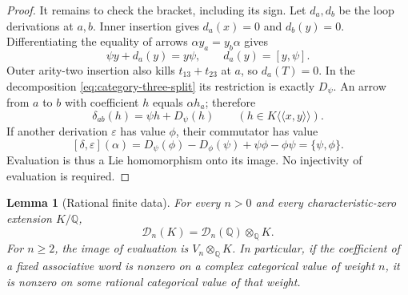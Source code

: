 \documentclass[11pt]{article}
\newtheorem{lemma}[theorem]{Lemma}
\theoremstyle{definition}
\theoremstyle{remark}
\numberwithin{equation}{section}
\begin{document}
\begin{proof}
It remains to check the bracket, including its sign.  Let $d_a,d_b$
be the loop derivations at $a,b$.  Inner insertion gives $d_a(x)=0$
and $d_b(y)=0$.  Differentiating the equality of arrows
$\alpha y_a=y_b\alpha$ gives
\[
 \psi y+d_a(y)=y\psi,
 \qquad d_a(y)=[y,\psi].
\]
Outer arity-two insertion also kills $t_{13}+t_{23}$ at $a$, so
$d_a(T)=0$.  In the decomposition
\eqref{eq:category-three-split} its restriction is exactly $D_\psi$.
An arrow from $a$ to $b$ with coefficient $h$ equals $\alpha h_a$;
therefore
\begin{equation}\label{eq:category-arrow-derivative}
 \delta_{ab}(h)=\psi h+D_\psi(h)
 \qquad(h\in K\langle\!\langle x,y\rangle\!\rangle).
\end{equation}
If another derivation $\varepsilon$ has value $\phi$, their commutator
has value
\[
 [\delta,\varepsilon](\alpha)
 =D_\psi(\phi)-D_\phi(\psi)+\psi\phi-\phi\psi
 =\{\psi,\phi\}.
\]
Evaluation is thus a Lie homomorphism onto its image.  No injectivity
of evaluation is required.
\end{proof}

\begin{lemma}[Rational finite data]\label{lem:rational-descent}
For every $n>0$ and every characteristic-zero extension $K/\mathbb Q$,
\[
 \mathcal D_n(K)=\mathcal D_n(\mathbb Q)\otimes_{\mathbb Q}K.
\]
For $n\geq2$, the image of evaluation is $V_n\otimes_{\mathbb Q}K$.
In particular, if the coefficient of a fixed associative word is
nonzero on a complex categorical value of weight $n$, it is nonzero
on some rational categorical value of that weight.
\end{lemma}
\end{document}
